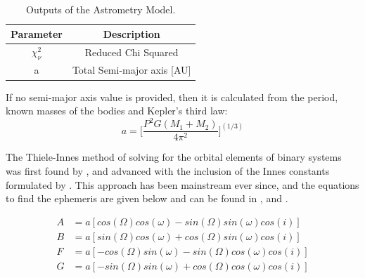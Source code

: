 \documentclass[10pt,preprint]{aastex}
\begin{document}

\begin{table}[h]
\centering
\caption{ Outputs of the Astrometry Model.}
\begin{tabular}{c c}
\hline\hline
Parameter & Description \\
\hline
$\chi^{2}_{\nu}$ & Reduced Chi Squared \\
a & Total Semi-major axis [AU]  \\

\hline
\end{tabular}
\end{table}


If no semi-major axis value is provided, then it is calculated from the period, known masses of the bodies and Kepler's third law:
\begin{equation}\label{eq:28}
a = \bigg[\frac{P^2G(M_1+M_2)}{4\pi^2} \bigg]^{(1/3)}
\end{equation}

The Thiele-Innes method of solving for the orbital elements of binary systems was first found by \citet{Thiele}, and advanced with the inclusion of the Innes constants formulated by \citet{Van}.  This approach has been mainstream ever since, and the equations to find the ephemeris are given below and can be found in \citet{aitken}, \citet{binnendijk} and \citet{heintz}.



\begin{subequations}
\begin{align}\label{eq:24a}
A& = a[cos(\Omega)cos(\omega)-sin(\Omega)sin(\omega)cos(i)]\\
\label{eq:24b}
B& = a[sin(\Omega)cos(\omega)+cos(\Omega)sin(\omega)cos(i)]\\
\label{eq:24c}
F& = a[-cos(\Omega)sin(\omega)-sin(\Omega)cos(\omega)cos(i)]\\
\label{eq:24d}
G& = a[-sin(\Omega)sin(\omega)+cos(\Omega)cos(\omega)cos(i)]
\end{align}
\end{subequations}
\end{document}
